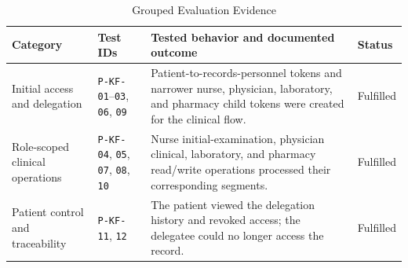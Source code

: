 \begin{table}[t]
	\caption{Grouped Evaluation Evidence}
	\label{tab:evaluation-summary}
	\centering
	\small
	\setlength{\tabcolsep}{4pt}
	\begin{tabular}{@{}p{}p{}p{}p{}@{}}
		\toprule
		\textbf{Category}                                                                                                                              & \textbf{Test IDs} & \textbf{Tested behavior and documented outcome} & \textbf{Status} \\
		\midrule
		Initial access and delegation                                                                                                                  &
		\texttt{P-KF-01}--\texttt{03}, \texttt{06}, \texttt{09}                                                                                        &
		Patient-to-records-personnel tokens and narrower nurse, physician, laboratory, and pharmacy child tokens were created for the clinical flow.   &
		Fulfilled                                                                                                                                                                                                                              \\
		Role-scoped clinical operations                                                                                                                &
		\texttt{P-KF-04}, \texttt{05}, \texttt{07}, \texttt{08}, \texttt{10}                                                                           &
		Nurse initial-examination, physician clinical, laboratory, and pharmacy read/write operations processed their corresponding segments.          &
		Fulfilled                                                                                                                                                                                                                              \\
		Patient control and traceability                                                                                                               &
		\texttt{P-KF-11}, \texttt{12}                                                                                                                  &
		The patient viewed the delegation history and revoked access; the delegatee could no longer access the record.                                 &
		Fulfilled                                                                                                                                                                                                                              \\

\end{tabular}
\end{table}
